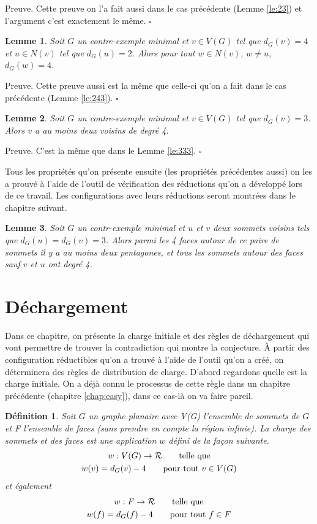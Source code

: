 \documentclass[10pt,a4paper]{article}
\newtheorem{definition}{Définition}
\newtheorem{lemme}{Lemme}
\newcommand{\ep}{{\hfill $\square$}}
\begin{document}
Preuve. 
Cette preuve on l'a fait aussi dans le cas précédente (Lemme \ref{le:23}) et l'argument c'est exactement le même.
\ep 

\begin{lemme}
Soit $G$ un contre-exemple minimal et $v \in V(G)$ tel que $d_G(v)=4$ et $u\in N(v)$ tel que $d_G(u) = 2$. Alors pour tout $w \in N(v)$, $w \neq u$, $d_G(w) = 4$.
\end{lemme}

Preuve.
Cette preuve aussi est la même que celle-ci qu'on a fait dans le cas précédente (Lemme \ref{le:243}).
\ep

\begin{lemme}
Soit $G$ un contre-exemple minimal et $v \in V(G)$ tel que $d_G(v) = 3$. Alors $v$ a au moins deux voisins de degré 4.
\end{lemme}

Preuve.
C'est la même que dans le Lemme \ref{le:333}.
\ep

Tous les propriétés qu'on présente ensuite (les propriétés précédentes aussi) on les a prouvé à l'aide de l'outil de vérification des réductions qu'on a développé lors de ce {\color{red}travail}. Les configurations avec leurs réductions seront montrées dans le chapitre suivant.

\begin{lemme}
Soit $G$ un contr-exemple minimal et $u$ et $v$ deux sommets voisins tels que $d_G(u)=d_G(v) = 3$. Alors parmi les 4 faces autour de ce paire de sommets il y a au moins deux pentagones, et tous les sommets autour des faces sauf $v$ et $u$ ont degré 4.
\end{lemme}

 

\section{Déchargement}

Dans ce chapitre, on présente la charge initiale et des règles de déchargement qui vont permettre de trouver la contradiction qui montre la conjecture. \` A partir des configuration réductibles qu'on a trouvé à l'aide de l'outil qu'on a créé, on déterminera des règles de distribution de charge. D'abord regardons quelle est la charge initiale. On a déjà connu le processus de cette règle dans un chapitre précédente (chapitre \ref{chap:easy}), dans ce cas-là on va faire pareil.

\begin{definition}
Soit $G$ un graphe planaire avec V(G) l'ensemble de sommets de $G$ et F l'ensemble de faces (sans prendre en compte la région infinie). La \emph{charge} des sommets et des faces est une application $w$ défini de la façon suivante.
$$
\gathered
w: V(G) \to \mathcal{R} \qquad \textrm{telle que}\\
w(v) = d_G(v) - 4 \qquad \textrm{pour tout $v \in V(G)$}\\
\endgathered
$$
et également
$$
\gathered
w: F \to \mathcal{R} \qquad \textrm{telle que}\\
w(f) = d_G(f) - 4 \qquad \textrm{pour tout $f \in F$}\\
\endgathered
$$
\end{definition}
\end{document}
